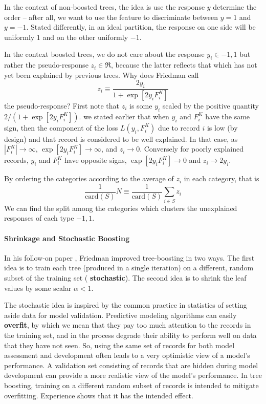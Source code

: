 \documentclass{article}
\begin{document}
In the context of non-boosted trees, the idea is use the response $y$
determine the order -- after all, we want to use the feature to
discriminate between $y=1$ and $y=-1$.  Stated differently, in an
ideal partition, the response on one side will be uniformly $1$ and on
the other uniformly $-1$.

In the context boosted trees, we do not care about the response $y_i
\in {-1,1}$ but rather the pseudo-response $z_i \in \Re$, because the
latter reflects that which has not yet been explained by previous
trees.  Why does Friedman call
\[
z_i \equiv \frac{ 2 y_i } { 1 + \exp [ 2 y_i F_i^K ] }
\]
the pseudo-response?  First note that $z_i$ is some $y_i$ scaled by
the positive quantity $2/( 1 + \exp [ 2 y_i F_i^K ] )$.  we stated
earlier that when $y_i$ and $F_i^K$ have the same sign, then the
component of the loss $L(y_i,F_i^K)$ due to record $i$ is low (by
design) and that record is considered to be well explained.  In that
case, as $|F_i^K| \rightarrow \infty$, $\exp [ 2 y_i F_i^K ]
\rightarrow \infty$, and $z_i \rightarrow 0$.  Conversely for poorly
explained records, $y_i$ and $F_i^K$ have opposite signs, $\exp [ 2
  y_i F_i^K ] \rightarrow 0$ and $z_i \rightarrow 2 y_i$.

By ordering the categories according to the average of $z_i$ in each
category, that is
\[
\frac{1}{\text{card}(S)} N \equiv \frac{1}{\text{card}(S)} \sum_{i \in S} z_i
\]
We can find the split among the categories which clusters the
unexplained responses of each type ${-1,1}$.

\paragraph{Shrinkage and Stochastic Boosting}

In his follow-on paper \cite{SGB}, Friedman improved tree-boosting in
two ways.  The first idea is to train each tree (produced in a single
iteration) on a different, random subset of the training set ({\bf
stochastic}).  The second idea is to shrink the leaf values by some
scalar $\alpha < 1$.

The stochastic idea is inspired by the common practice in statistics
of setting aside data for model validation.  Predictive modeling
algorithms can easily {\bf overfit}, by which we mean that they pay
too much attention to the records in the training set, and in the
process degrade their ability to perform well on data that they have
not seen.  So, using the same set of records for both model assessment
and development often leads to a very optimistic view of a model's
performance.  A validation set consisting of records that are hidden
during model development can provide a more realistic view of the
model's performance.  In tree boosting, training on a different random
subset of records is intended to mitigate overfitting.  Experience
shows that it has the intended effect.
\end{document}
